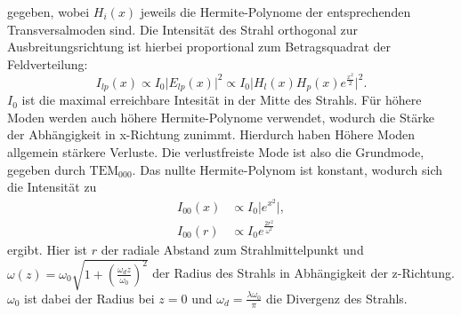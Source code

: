 gegeben, wobei $H_i(x)$ jeweils die Hermite-Polynome der entsprechenden Transversalmoden sind. Die Intensität des Strahl orthogonal zur Ausbreitungsrichtung ist hierbei
proportional zum Betragsquadrat der Feldverteilung:
\begin{equation}
    I_{lp}(x) \propto I_0 \lvert E_{lp}(x) \rvert ^2 \propto I_0 \lvert H_l(x) H_p(x) e^{\frac{x^2}{2}} \rvert ^2.
\end{equation}
$I_0$ ist die maximal erreichbare Intesität in der Mitte des Strahls. Für höhere Moden werden auch höhere Hermite-Polynome verwendet, wodurch die Stärke der
Abhängigkeit in x-Richtung zunimmt. Hierdurch haben Höhere Moden allgemein stärkere Verluste. Die verlustfreiste Mode ist also die Grundmode, gegeben durch $\mathrm{TEM}_{000}$.
Das nullte Hermite-Polynom ist konstant, wodurch sich die Intensität zu
\begin{align}
    I_{00}(x) &\propto I_0 \lvert e^{x^2} \rvert ,\\
    I_{00}(r) &\propto I_0 e^{\frac{2r^2}{\omega^2}}
\end{align}
ergibt. Hier ist $r$ der radiale Abstand zum Strahlmittelpunkt und $\omega(z) = \omega_0\sqrt{1+(\frac{\omega_d z}{\omega_0})^2}$ der Radius des Strahls in Abhängigkeit der z-Richtung.
$\omega_0$ ist dabei der Radius bei $z=0$ und $\omega_d = \frac{\lambda\omega_0}{\pi}$ die Divergenz des Strahls.